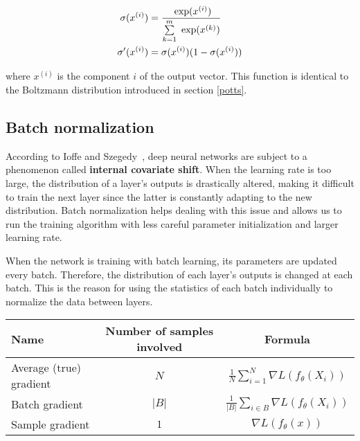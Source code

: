         \begin{equation}
            \begin{split}
                \sigma(x^{(i)}) & = \frac{\text{ exp}(x^{(i)})}{\sum\limits_{k=1}^m \text{ exp}(x^{(k)})} \\
                \sigma'(x^{(i)}) & = \sigma(x^{(i)}) (1 - \sigma(x^{(i)}))
            \end{split}
        \end{equation}

        where $x^{(i)}$ is the component $i$ of the output vector.
        This function is identical to the Boltzmann distribution introduced in section \ref{potts}.


    \subsection{Batch normalization}

        According to Ioffe and Szegedy~\cite{DBLP:journals/corr/IoffeS15}, deep neural networks are subject to a phenomenon
        called \textbf{internal covariate shift}. When the learning rate is too large, the distribution of a layer's outputs
        is drastically altered, making it difficult to train the next layer since the latter is constantly adapting to the new
        distribution. Batch normalization helps dealing with this issue and allows us to run the training algorithm with less
        careful parameter initialization and larger learning rate.

        When the network is training with batch learning, its parameters are updated every batch. Therefore, the distribution
        of each layer's outputs is changed at each batch. This is the reason for using the statistics of each batch individually
        to normalize the data between layers.

        \begin{table}[H]
            \centering
            \begin{tabular}{|l|c|c|}
                \hline
                Name & Number of samples involved & Formula \\
                \hline
                \hline
                Average (true) gradient & $N$ & $\frac{1}{N} \sum\limits_{i=1}^N \nabla L(f_{\theta}(X_i))$ \\
                \hline
                Batch gradient & $\vert B \vert$ & $\frac{1}{\vert B \vert} \sum\limits_{i \in B} \nabla L(f_{\theta}(X_i))$ \\
                \hline
                Sample gradient & $1$ & $\nabla L(f_{\theta}(x))$ \\
                \hline
            \end{tabular}
            \label{gradients}
        \end{table}

